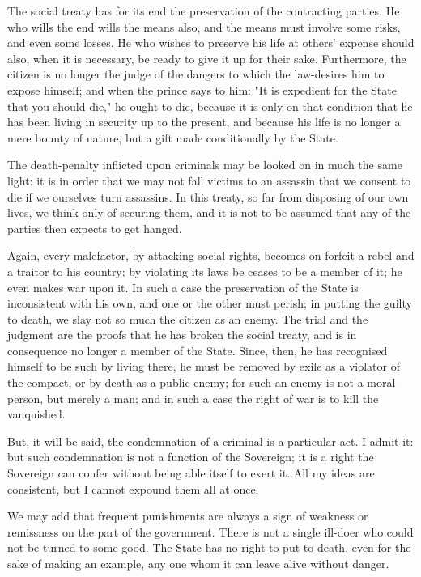 \documentclass[12pt]{book}
\begin{document}
The social treaty has for its end the preservation of the contracting parties. He who wills the end wills the means also, and the means must involve some risks, and even some losses. He who wishes to preserve his life at others' expense should also, when it is necessary, be ready to give it up for their sake. Furthermore, the citizen is no longer the judge of the dangers to which the law-desires him to expose himself; and when the prince says to him: "It is expedient for the State that you should die," he ought to die, because it is only on that condition that he has been living in security up to the present, and because his life is no longer a mere bounty of nature, but a gift made conditionally by the State.

The death-penalty inflicted upon criminals may be looked on in much the same light: it is in order that we may not fall victims to an assassin that we consent to die if we ourselves turn assassins. In this treaty, so far from disposing of our own lives, we think only of securing them, and it is not to be assumed that any of the parties then expects to get hanged.

Again, every malefactor, by attacking social rights, becomes on forfeit a rebel and a traitor to his country; by violating its laws be ceases to be a member of it; he even makes war upon it. In such a case the preservation of the State is inconsistent with his own, and one or the other must perish; in putting the guilty to death, we slay not so much the citizen as an enemy. The trial and the judgment are the proofs that he has broken the social treaty, and is in consequence no longer a member of the State. Since, then, he has recognised himself to be such by living there, he must be removed by exile as a violator of the compact, or by death as a public enemy; for such an enemy is not a moral person, but merely a man; and in such a case the right of war is to kill the vanquished.

But, it will be said, the condemnation of a criminal is a particular act. I admit it: but such condemnation is not a function of the Sovereign; it is a right the Sovereign can confer without being able itself to exert it. All my ideas are consistent, but I cannot expound them all at once.

We may add that frequent punishments are always a sign of weakness or remissness on the part of the government. There is not a single ill-doer who could not be turned to some good. The State has no right to put to death, even for the sake of making an example, any one whom it can leave alive without danger.
\end{document}
